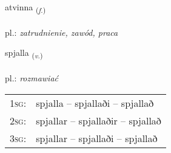 \documentclass[frontgrid, backgrid]{flacards}\usepackage[]{graphicx}\usepackage[]{xcolor}
\begin{document}
\renewcommand{\blhead}{\vskip5pt {\small\bfseries\footnotesize Nafnorð | rzeczownik }}
\renewcommand{\bcfoot}{\vskip5pt \hspace{2pt}{\small\bfseries\footnotesize 3K}}


{atvinna \small{\textsubscript{(\textit{f.})}} \\[1ex] %
\textphonetic{[aːtvɪna]} \\
pl.: \emph{zatrudnienie, zawód, praca} \\  [2ex]
\renewcommand*{\arraystretch}{0.8}
}

\renewcommand{\flhead}{\vskip5pt \fboxsep=0pt {\small\bfseries\footnotesize Sagnorð | czasownik}}
\renewcommand{\fcfoot}{\vskip5pt \fboxsep=0pt \hspace{2pt}{\small\bfseries\footnotesize 3K}}

\renewcommand{\blhead}{\vskip5pt {\small\bfseries\footnotesize Sagnorð | czasownik }}
\renewcommand{\bcfoot}{\vskip5pt \hspace{2pt}{\small\bfseries\footnotesize 3K}}


{spjalla \small{\textsubscript{(\textit{v.})}} \\[1ex] %
\textphonetic{[spjatla]} \\
pl.: \emph{rozmawiać} \\  [2ex]
\renewcommand*{\arraystretch}{0.8}
\begin{tabular}{p{1cm}l}
\textsc{1sg}: & spjalla -- spjallaði -- spjallað \\ 
\textsc{2sg}: & spjallar -- spjallaðir -- spjallað \\ 
\textsc{3sg}: & spjallar -- spjallaði -- spjallað \\ 
\end{tabular}
}
\end{document}
